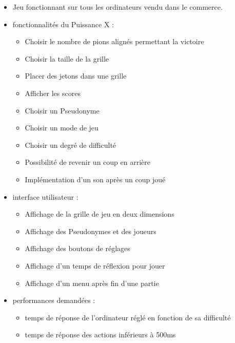 \documentclass[a4paper,oneside]{article}
\begin{document}
\begin{itemize}
    \item Jeu fonctionnant sur tous les ordinateurs vendu dans le commerce.
    \item fonctionnalités du Puissance X :
        \begin{itemize}
        	\item Choisir le nombre de pions alignés permettant la victoire
        	\item Choisir la taille de la grille
            \item Placer des jetons dans une grille
            \item Afficher les scores
            \item Choisir un Pseudonyme 
            \item Choisir un mode de jeu
            \item Choisir un degré de difficulté
            \item Possibilité de revenir un coup en arrière
            \item Implémentation d'un son après un coup joué
        \end{itemize}
    \item interface utilisateur :
        \begin{itemize}
            \item Affichage de la grille de jeu en deux dimensions
            \item Affichage des Pseudonymes et des joueurs
            \item Affichage des boutons de réglages
            \item Affichage d'un temps de réflexion pour jouer
            \item Affichage d'un menu après fin d'une partie
        \end{itemize}
    \item performances demandées :
        \begin{itemize}
            \item temps de réponse de l'ordinateur réglé en fonction de sa difficulté
            \item temps de réponse des actions inférieurs à 500ms
        \end{itemize}

\end{itemize}



\newpage

\appendix
\end{document}
